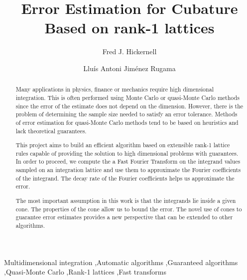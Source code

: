 \documentclass[]{elsarticle}
\theoremstyle{definition}
\begin{document}
\begin{frontmatter}

\title{Error Estimation for Cubature Based on rank-1 lattices}
\author{Fred J. Hickernell}
\address{Room E1-208, Department of Applied Mathematics, Illinois Institute of Technology,\\ 10 W.\ 32$^{\text{nd}}$ St., Chicago, IL 60616}
\author{Llu\'{i}s Antoni Jim\'{e}nez Rugama}
\address{Room E1-120, Department of Applied Mathematics, Illinois Institute of Technology,\\ 10 W.\ 32$^{\text{nd}}$ St., Chicago, IL 60616}
\begin{abstract}

Many applications in physics, finance or mechanics require high dimensional integration. This is often performed using Monte Carlo or quasi-Monte Carlo methods since the error of the estimate does not depend on the dimension. However, there is the problem of determining the sample size needed to satisfy an error tolerance. Methods of error estimation for quasi-Monte Carlo methods tend to be based on heuristics and lack theoretical guarantees.

This project aims to build an efficient algorithm based on extensible rank-1 lattice rules capable of providing the solution to high dimensional problems with guarantees. In order to proceed, we compute the a Fast Fourier Transform on the integrand values sampled on an integration lattice and use them to approximate the Fourier coefficients of the integrand. The decay rate of the Fourier coefficients helps us approximate the error.

The most important assumption in this work is that the integrands lie inside a given cone. The properties of the cone allow us to bound the error. The novel use of cones to guarantee error estimates provides a new perspective that can be extended to other algorithms.

\end{abstract}

\begin{keyword}
Multidimensional integration \sep Automatic algorithms \sep Guaranteed algorithms \sep Quasi-Monte Carlo \sep Rank-1 lattices \sep Fast transforms


\end{keyword}
\end{frontmatter}
\end{document}

